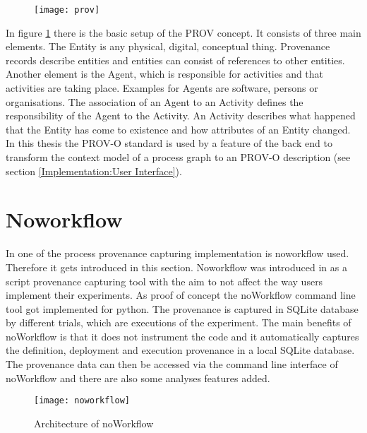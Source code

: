 \documentclass[draft,final]{vutinfth} %
\begin{document}
\begin{figure}[h]
	\centering
	\texttt{[image: prov]}
	\caption{\cite{733f89c65e4844f9aabcae1c276a5602}}
	\label{fig:prov} %
\end{figure}

In figure \ref{fig:prov} there is the basic setup of the PROV concept. It consists of three main elements. The Entity is any physical, digital, conceptual thing. Provenance records describe entities and entities can consist of references to other entities. Another element is the Agent, which is responsible for activities and that activities are taking place. Examples for Agents are software, persons or organisations. The association of an Agent to an Activity defines the responsibility of the Agent to the Activity. An Activity describes what happened that the Entity has come to existence and how attributes of an Entity changed.\cite{f06eee9045b445be89cf07100b3ce05c} In this thesis the PROV-O standard is used by a feature of the back end to transform the context model of a process graph to an PROV-O description (see section \ref{Implementation:User Interface}). 

\section{Noworkflow}\label{Noworkflow}

In one of the process provenance capturing implementation is noworkflow used. Therefore it gets introduced in this section. Noworkflow was introduced in \cite{c9e0604becba42af96a9cb0a6f60018b} as a script provenance capturing tool with the aim to not affect the way users implement their experiments. As proof of concept the noWorkflow command line tool got implemented for python. The provenance is captured in SQLite database by different trials, which are executions of the experiment. The main benefits of noWorkflow is that it does not instrument the code and it automatically captures the definition, deployment and execution provenance in a local SQLite database. The provenance data can then be accessed via the command line interface of noWorkflow and there are also some analyses features added.\cite{c9e0604becba42af96a9cb0a6f60018b}

\begin{figure}[h]
	\centering
	\texttt{[image: noworkflow]}
	\caption{Architecture of noWorkflow \cite{c9e0604becba42af96a9cb0a6f60018b}}
	\label{fig:noworkflow} %
\end{figure}
\end{document}
